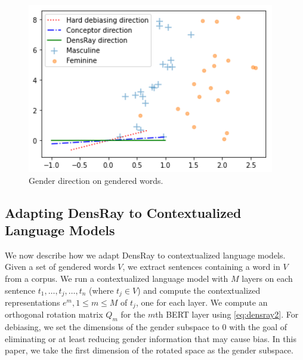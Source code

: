 \begin{figure}[h]
	\centering
	\includegraphics[width=0.5\linewidth]{examples.png}
	\caption{Gender direction on gendered words.}
\end{figure}

\subsection{Adapting DensRay to Contextualized Language Models}
We now describe how we adapt DensRay to contextualized
language models. Given a set of gendered words
$V$, we extract sentences containing a word in $V$ from a
corpus. We run a contextualized language model
with $M$ layers
on each
sentence
$t_1,\ldots,t_j,\ldots,t_n$ (where $t_j \in V$)
and compute the contextualized representations $e^m, 1\leq m
\leq M$ of $t_j$, one for each layer. 
We compute an orthogonal rotation
matrix $Q_m$ for the $m$th BERT layer using \eqref{eq:densray2}.
For debiasing, we set the dimensions
of the gender subspace to $0$ with the goal of eliminating or at least reducing gender
information that may cause bias. In this paper, we take the first dimension of the rotated space as the gender subspace.

